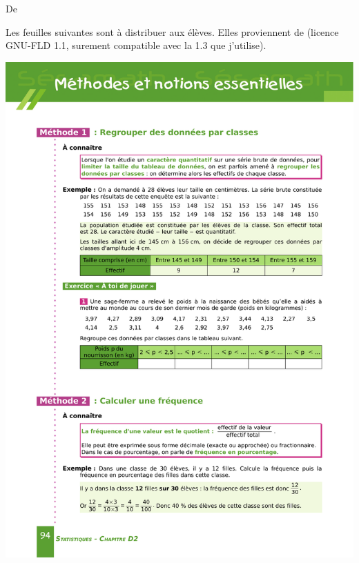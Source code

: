 


De \cite{NRHooXFvgpp5}

\vfill

Les feuilles suivantes sont à distribuer aux élèves. Elles proviennent de \cite{NRHooXFvgpp5} (licence GNU-FLD 1.1, surement compatible avec la 1.3 que j'utilise).

\begin{center}
\includegraphics{sesamath5p94.pdf}
\end{center}
